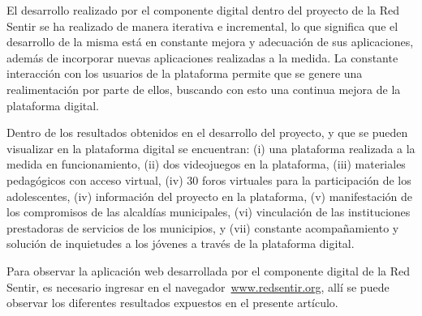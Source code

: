 \documentclass[journal,transmag]{IEEEtran}
\begin{document}
\vspace{4mm}
\vspace{4mm}

El desarrollo realizado por el componente digital dentro del proyecto de la Red Sentir se ha realizado de manera iterativa e incremental, lo que significa que el desarrollo de la misma está en constante mejora y adecuación de sus aplicaciones, además de incorporar nuevas aplicaciones realizadas a la medida. La constante interacción con los usuarios de la plataforma permite que se genere una realimentación por parte de ellos, buscando con esto una continua mejora de la plataforma digital.

Dentro de los resultados obtenidos en el desarrollo del proyecto, y que se pueden visualizar en la plataforma digital se encuentran: (i) una plataforma realizada a la medida en funcionamiento, (ii) dos videojuegos en la plataforma, (iii) materiales pedagógicos con acceso virtual, (iv) $30$ foros virtuales para la participación de los adolescentes, (iv) información del proyecto en la plataforma, (v) manifestación de los compromisos de las alcaldías municipales, (vi) vinculación de las instituciones prestadoras de servicios de los municipios, y (vii) constante acompañamiento y solución de inquietudes a los jóvenes a través de la plataforma digital.

Para observar la aplicación web desarrollada por el componente digital de la Red Sentir, es necesario ingresar en el navegador~\url{www.redsentir.org}, allí se puede observar los diferentes resultados expuestos en el presente artículo.
\end{document}
